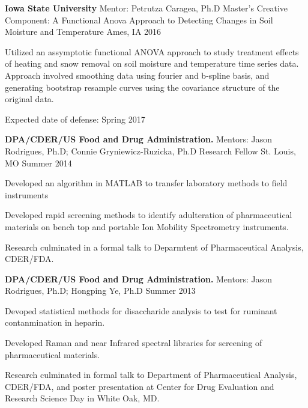 \documentclass[11pt, a4paper]{awesome-cv}
\begin{document}
\begin{cventries}
\cventry
    {\textbf{Iowa State University} \newline Mentor: Petrutza Caragea, Ph.D}
    {Master's Creative Component: A Functional Anova Approach to Detecting Changes in Soil Moisture and Temperature}
    {Ames, IA}
    {2016}
    {
      \begin{cvitems}
        \item Utilized an assymptotic functional ANOVA approach to study treatment effects of heating and snow removal on soil moisture and temperature time series data. Approach involved smoothing data using fourier and b-spline basis, and generating bootstrap resample curves using the covariance structure of the original data.   
        \item Expected date of defense: Spring 2017
      \end{cvitems}
    }
\end{cventries}
\vspace*{-\baselineskip}
\begin{cventries}
  \cventry
    {\textbf{DPA/CDER/US Food and Drug Administration.} \newline Mentors: Jason Rodrigues, Ph.D; Connie Gryniewicz-Ruzicka, Ph.D}
    {Research Fellow}
    {St. Louis, MO}
    {Summer 2014 \newline}
    {
      \begin{cvitems}
        \item {Developed an algorithm in MATLAB to transfer laboratory methods to field instruments}
        \item {Developed rapid screening methods to identify adulteration of pharmaceutical materials on bench top and portable Ion Mobility Spectrometry instruments.}
        \item {Research culminated in a formal talk to Deparmtent of Pharmaceutical Analysis, CDER/FDA.}
      \end{cvitems}
    }
\end{cventries}
\vspace*{-\baselineskip}
\begin{cventries}
  \cventry
    {\textbf{DPA/CDER/US Food and Drug Administration.} \newline Mentors: Jason Rodrigues, Ph.D; Hongping Ye, Ph.D}
    {}
    {}
    {Summer 2013 \newline}
    {
      \begin{cvitems}
        \item {Devoped statistical methods for disaccharide analysis to test for ruminant contanmination in heparin. }
        \item {Developed Raman and near Infrared spectral libraries for screening of pharmaceutical materials.}
        \item {Research culminated in formal talk to Department of Pharmaceutical Analysis, CDER/FDA, and poster presentation at Center for Drug Evaluation and Research Science Day in White Oak, MD.}
      \end{cvitems}
    }
    \end{cventries}
\end{document}
